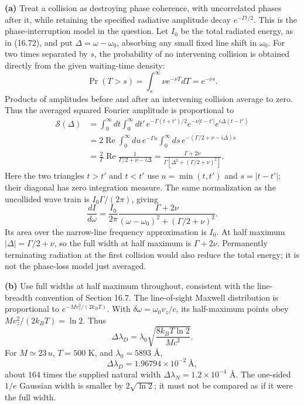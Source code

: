 \textbf{(a)} Treat a collision as destroying phase coherence, with
uncorrelated phases after it, while retaining the specified radiative
amplitude decay $e^{-\Gamma t/2}$. This is the phase-interruption model
in the question. Let $I_0$ be the total radiated energy, as in (16.72),
and put $\Delta=\omega-\omega_0$, absorbing any small fixed line shift
in $\omega_0$.
For two times separated by $s$, the probability of no intervening
collision is obtained directly from the given waiting-time density:
\[
\Pr(T>s)=\int_s^\infty\nu e^{-\nu T}dT=e^{-\nu s}.
\]
Products of amplitudes before and after an intervening collision average
to zero. Thus the averaged squared Fourier amplitude is proportional to
\begin{align*}
\mathcal S(\Delta)
&=\int_0^\infty dt\int_0^\infty dt'\,
 e^{-\Gamma(t+t')/2}e^{-\nu|t-t'|}e^{i\Delta(t-t')}\\
&=2\operatorname{Re}\int_0^\infty du\,e^{-\Gamma u}
 \int_0^\infty ds\,e^{-(\Gamma/2+\nu-i\Delta)s}\\
&=\frac2\Gamma\operatorname{Re}\frac1{\Gamma/2+\nu-i\Delta}
=\frac{\Gamma+2\nu}{\Gamma[\Delta^2+(\Gamma/2+\nu)^2]}.
\end{align*}
Here the two triangles $t>t'$ and $t<t'$ use $u=\min(t,t')$ and
$s=|t-t'|$; their diagonal has zero integration measure.
The same normalization as the uncollided wave train is
$I_0\Gamma/(2\pi)$, giving
\[
\boxed{\frac{dI}{d\omega}=\frac{I_0}{2\pi}
\frac{\Gamma+2\nu}{(\omega-\omega_0)^2+(\Gamma/2+\nu)^2}.}
\]
Its area over the narrow-line frequency approximation is $I_0$.
At half maximum $|\Delta|=\Gamma/2+\nu$, so the full width at half
maximum is $\Gamma+2\nu$.
Permanently terminating radiation at the first collision would also
reduce the total energy; it is not the phase-loss model just averaged.

\textbf{(b)} Use full widths at half maximum throughout, consistent
with the line-breadth convention of Section 16.7.
The line-of-sight Maxwell distribution is proportional to
$e^{-Mv_z^2/(2k_BT)}$. With $\delta\omega=\omega_0v_z/c$,
its half-maximum points obey
$Mv_z^2/(2k_BT)=\ln2$. Thus
\[
\Delta\lambda_D=\lambda_0\sqrt{\frac{8k_BT\ln2}{Mc^2}}.
\]
For $M\simeq23\,u$, $T=500$ K, and $\lambda_0=5893$ \AA,
\[
\boxed{\Delta\lambda_D=1.96794\times10^{-2}\ \text{\AA},}
\]
about $164$ times the supplied natural width
$\Delta\lambda_{\!N}=1.2\times10^{-4}$ \AA.
The one-sided $1/e$ Gaussian width is smaller by $2\sqrt{\ln2}$;
it must not be compared as if it were the full width.

